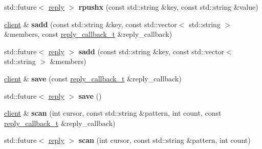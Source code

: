 \begin{DoxyCompactItemize}
\item 
\mbox{\label{classcpp__redis_1_1client_a83d512f8f44f896383d050920634489f}} 
std\+::future$<$ \hyperlink{classcpp__redis_1_1reply}{reply} $>$ {\bfseries rpushx} (const std\+::string \&key, const std\+::string \&value)
\item 
\mbox{\label{classcpp__redis_1_1client_acf725ad7bc758599617ff166280f9622}} 
\hyperlink{classcpp__redis_1_1client}{client} \& {\bfseries sadd} (const std\+::string \&key, const std\+::vector$<$ std\+::string $>$ \&members, const \hyperlink{classcpp__redis_1_1client_a061a1140d36d2eaeda82b09a0bb3f9f2}{reply\+\_\+callback\+\_\+t} \&reply\+\_\+callback)
\item 
\mbox{\label{classcpp__redis_1_1client_a1a611fd2c5847d37973fed5d24f25fa1}} 
std\+::future$<$ \hyperlink{classcpp__redis_1_1reply}{reply} $>$ {\bfseries sadd} (const std\+::string \&key, const std\+::vector$<$ std\+::string $>$ \&members)
\item 
\mbox{\label{classcpp__redis_1_1client_a01987f9fb419cfbce81872be8cd17619}} 
\hyperlink{classcpp__redis_1_1client}{client} \& {\bfseries save} (const \hyperlink{classcpp__redis_1_1client_a061a1140d36d2eaeda82b09a0bb3f9f2}{reply\+\_\+callback\+\_\+t} \&reply\+\_\+callback)
\item 
\mbox{\label{classcpp__redis_1_1client_a40f28e53d89e46aff3df4670736b1034}} 
std\+::future$<$ \hyperlink{classcpp__redis_1_1reply}{reply} $>$ {\bfseries save} ()
\item 
\mbox{\label{classcpp__redis_1_1client_a3c4a8cc50f4e2152c7c79e876bf73294}} 
\hyperlink{classcpp__redis_1_1client}{client} \& {\bfseries scan} (int cursor, const std\+::string \&pattern, int count, const \hyperlink{classcpp__redis_1_1client_a061a1140d36d2eaeda82b09a0bb3f9f2}{reply\+\_\+callback\+\_\+t} \&reply\+\_\+callback)
\item 
\mbox{\label{classcpp__redis_1_1client_a847910b59d8c89acf37190f1b7e384ec}} 
std\+::future$<$ \hyperlink{classcpp__redis_1_1reply}{reply} $>$ {\bfseries scan} (int cursor, const std\+::string \&pattern, int count)

\end{DoxyCompactItemize}
